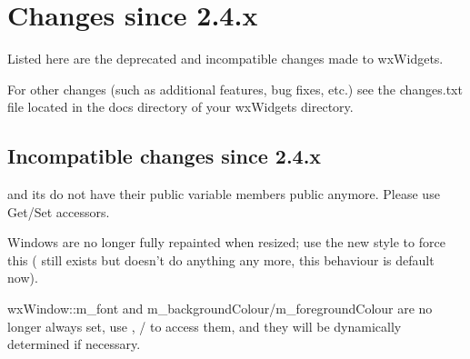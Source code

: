 \section{Changes since 2.4.x}\label{changes}

Listed here are the deprecated and incompatible changes made to wxWidgets.

For other changes (such as additional features, bug fixes, etc.) see the changes.txt file located in the docs directory of your wxWidgets directory.

\subsection{Incompatible changes since 2.4.x}\label{incompatiblesince24}


 and its  do not have their public variable members public anymore.
Please use Get/Set accessors.


Windows are no longer fully repainted when resized; use the new style  to force this ( still exists but doesn't do anything any more, this behaviour is default now).


wxWindow::m\_font and m\_backgroundColour/m\_foregroundColour are no longer always set, use , / to access them, and they will be dynamically determined if necessary.

